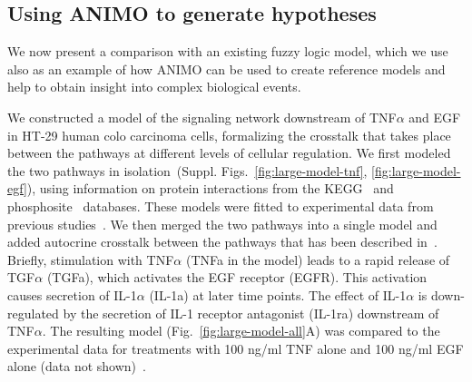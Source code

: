 \documentclass{bmcart}
\begin{document}
\subsection*{Using ANIMO to generate hypotheses}\label{subsec:case-study-larger}
We now present a comparison with an existing fuzzy logic model, which we use also as an example of how
ANIMO can be used to create reference models and help to obtain insight into complex biological events.

We constructed a model of the signaling network downstream of TNF$\alpha$ and EGF
in HT-29 human colo carcinoma cells, formalizing
the crosstalk that takes place between the pathways at different levels of cellular regulation.
We first modeled the two pathways in isolation~(Suppl. Figs.~\ref{fig:large-model-tnf}, \ref{fig:large-model-egf}),
using information on protein interactions from
the KEGG~\cite{kegg} and phosphosite~\cite{phosphosite} databases. These models were fitted to experimental data
from previous studies~\cite{pathway-compendium,pathway-autocrine}.
We then merged the two pathways into a single model and added autocrine crosstalk between the pathways that has been
described in~\cite{pathway-autocrine}.
Briefly, stimulation with TNF$\alpha$ ({\sf TNFa} in the model) leads to a rapid release of TGF$\alpha$ ({\sf TGFa}),
which activates the EGF receptor ({\sf EGFR}).
This activation causes secretion of IL-1$\alpha$ ({\sf IL-1a}) at later time points.
The effect of IL-1$\alpha$ is down-regulated by the secretion of IL-1 receptor antagonist ({\sf IL-1ra})
downstream of TNF$\alpha$.
The resulting model (Fig.~\ref{fig:large-model-all}A) was compared to the experimental data
for treatments with 100 ng/ml TNF alone and 100 ng/ml EGF alone (data not shown)~\cite{pathway-compendium}.
\end{document}
